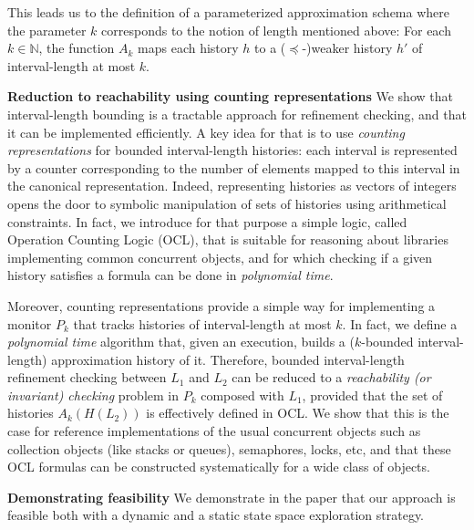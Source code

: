 This leads us to the definition of a parameterized approximation
schema where the parameter $k$ corresponds to the notion of length
mentioned above: For each $k \in \mathbb{N}$, the function $A_k$ maps each
history $h$ to a ($\preceq$-)weaker history $h'$ of interval-length at most $k$. 

\vspace{1mm}
\noindent
{\bf Reduction to reachability using counting representations}
We show that interval-length bounding is a tractable approach for
refinement checking, and that it can be implemented efficiently. A key idea for
that is to use \emph{counting representations} for bounded interval-length
histories: each interval is represented by a counter corresponding to the
number of elements mapped to this interval in the canonical representation.
Indeed, representing histories as vectors of integers opens the door
to symbolic manipulation of sets of histories using arithmetical constraints.
In fact, we introduce for that purpose a simple logic, called 
Operation Counting Logic (OCL), that is suitable for reasoning about libraries
implementing common concurrent objects, and for which checking if a given
history satisfies a formula can be done in \emph{polynomial time}.

Moreover, counting representations provide a simple way for implementing a
monitor $P_k$ that tracks histories of interval-length at most $k$. In fact, we define
a \emph{polynomial time} algorithm that, given an execution, builds a
($k$-bounded interval-length) approximation history of it. Therefore, bounded
interval-length refinement checking between $L_1$ and $L_2$ can be reduced to a
\emph{reachability (or invariant) checking} problem in $P_k$ composed with
$L_1$, provided that the set of histories $A_k(H(L_2))$ is effectively defined
in OCL. We show that this is the case for reference implementations of the
usual concurrent objects such as collection objects (like stacks or queues),
semaphores, locks, etc, and that these OCL formulas can be constructed systematically
for a wide class of objects.

\vspace{1mm}
\noindent
{\bf Demonstrating feasibility}
We demonstrate in the paper that our approach
is feasible both with a dynamic and a static state space exploration strategy.

